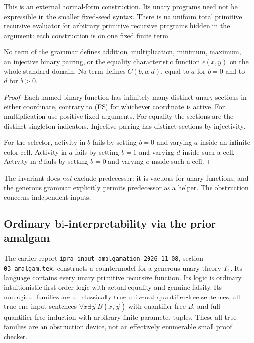 This is an external normal-form construction. Its unary programs need
not be expressible in the smaller fixed-seed syntax. There is no
uniform total primitive recursive evaluator for arbitrary primitive
recursive programs hidden in the argument: each construction is on one
fixed finite term.

\begin{corollary}
No term of the grammar defines addition, multiplication, minimum,
maximum, an injective binary pairing, or the equality characteristic
function \(\epsilon(x,y)\) on the whole standard domain. No term
defines \(C(b,a,d)\), equal to \(a\) for \(b=0\) and to \(d\) for \(b>0\).
\end{corollary}
\begin{proof}
Each named binary function has infinitely many distinct unary sections
in either coordinate, contrary to (FS) for whichever coordinate is
active. For multiplication use positive fixed arguments. For equality
the sections are the distinct singleton indicators. Injective pairing
has distinct sections by injectivity.

For the selector, activity in \(b\) fails by setting \(b=0\) and varying
\(a\) inside an infinite color cell. Activity in \(a\) fails by setting
\(b=1\) and varying \(d\) inside such a cell. Activity in \(d\) fails
by setting \(b=0\) and varying \(a\) inside such a cell.
\end{proof}

The invariant does \emph{not} exclude predecessor: it is vacuous for
unary functions, and the generous grammar explicitly permits
predecessor as a helper. The obstruction concerns independent inputs.

\subsection{Ordinary bi-interpretability via the prior amalgam}

The earlier report
\texttt{ipra\_input\_amalgamation\_2026-11-08}, section
\texttt{03\_amalgam.tex}, constructs a countermodel for a generous
unary theory \(T_1\). Its language contains every unary primitive
recursive function. Its logic is ordinary intuitionistic first-order
logic with actual equality and genuine falsity. Its nonlogical
families are all classically true universal quantifier-free sentences,
all true one-input sentences
\(\forall x\exists\vec y\,B(x,\vec y)\) with quantifier-free \(B\), and
full quantifier-free induction with arbitrary finite parameter tuples.
These all-true families are an obstruction device, not an effectively
enumerable small proof checker.


